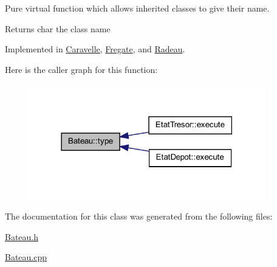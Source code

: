 Pure virtual function which allows inherited classes to give their name. 

\begin{DoxyReturn}{Returns}
char the class name 
\end{DoxyReturn}


Implemented in \hyperlink{class_caravelle_ae63b0717615fb34662d0189cefbb50d0}{Caravelle}, \hyperlink{class_fregate_aacc93c2b316de955f4e4717583c0a8c1}{Fregate}, and \hyperlink{class_radeau_aff23ef397c63721fd875e6c1090edb70}{Radeau}.



Here is the caller graph for this function:
\nopagebreak
\begin{figure}[H]
\begin{center}
\leavevmode
\includegraphics[width=290pt]{class_bateau_ad6775916a45ddbe18a9f06df79e2ba6f_icgraph}
\end{center}
\end{figure}




The documentation for this class was generated from the following files:\begin{DoxyCompactItemize}
\item 
\hyperlink{_bateau_8h}{Bateau.h}\item 
\hyperlink{_bateau_8cpp}{Bateau.cpp}\end{DoxyCompactItemize}
